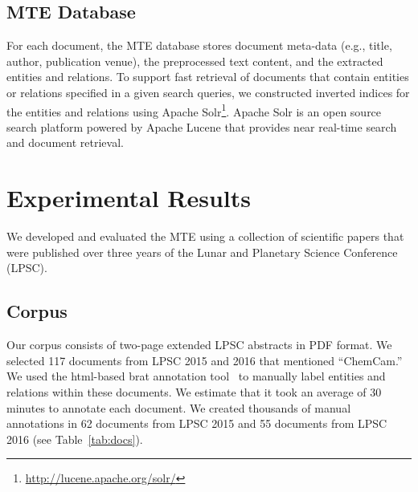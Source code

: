 \documentclass[letterpaper]{article} %
\begin{document}

\subsection{MTE Database}

For each document, the MTE database stores document meta-data (e.g.,
title, author, publication venue), the preprocessed text content, and
the extracted entities and relations.  To support fast retrieval of
documents that contain entities or relations specified in a given
search queries, we constructed inverted indices for the entities and
relations using Apache
Solr\footnote{\url{http://lucene.apache.org/solr/}}. Apache Solr is an
open source search platform powered by Apache Lucene that provides
near real-time search and document retrieval. 
 
\section{Experimental Results}

We developed and evaluated the MTE using a collection of scientific
papers that were published over three years of the Lunar and Planetary
Science Conference (LPSC).

\subsection{Corpus}

Our corpus consists of two-page extended LPSC abstracts in PDF format.
We selected 117 documents from LPSC 2015 and 2016 that mentioned
``ChemCam.''  We used the html-based brat annotation tool~\cite{brat}
to manually label entities and relations within these documents.  We
estimate that it took an average of 30 minutes to annotate each
document.  We created thousands of manual annotations in 62 documents
from LPSC 2015 and 55 documents from LPSC 2016 (see
Table~\ref{tab:docs}).
\end{document}

